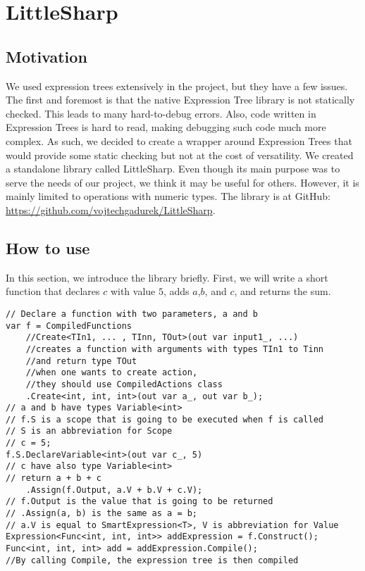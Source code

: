 \chapter{LittleSharp}\label{LittleSharp}
\section{Motivation}
We used expression trees extensively in the project, but they have a few issues. The first and foremost is that the native Expression Tree library is not statically checked. This leads to many hard-to-debug errors. Also, code written in Expression Trees is hard to read, making debugging such code much more complex. As such, we decided to create a wrapper around Expression Trees that would provide some static checking but not at the cost of versatility. We created a standalone library called LittleSharp. Even though its main purpose was to serve the needs of our project, we think it may be useful for others. However, it is mainly limited to operations with numeric types. The library is at GitHub: \url{https://github.com/vojtechgadurek/LittleSharp}.

\section{How to use}
In this section, we introduce the library briefly. First, we will write a short function that declares $c$ with value $5$, adds $a$,$b$, and $c$, and returns the sum.
\begin{lstlisting}
// Declare a function with two parameters, a and b
var f = CompiledFunctions
    //Create<TIn1, ... , TInn, TOut>(out var input1_, ...)
    //creates a function with arguments with types TIn1 to Tinn
    //and return type TOut
    //when one wants to create action,
    //they should use CompiledActions class
    .Create<int, int, int>(out var a_, out var b_);
// a and b have types Variable<int>
// f.S is a scope that is going to be executed when f is called
// S is an abbreviation for Scope
// c = 5; 
f.S.DeclareVariable<int>(out var c_, 5)
// c have also type Variable<int>
// return a + b + c
	.Assign(f.Output, a.V + b.V + c.V);
// f.Output is the value that is going to be returned
// .Assign(a, b) is the same as a = b;
// a.V is equal to SmartExpression<T>, V is abbreviation for Value
Expression<Func<int, int, int>> addExpression = f.Construct();
Func<int, int, int> add = addExpression.Compile();
//By calling Compile, the expression tree is then compiled 
\end{lstlisting}

